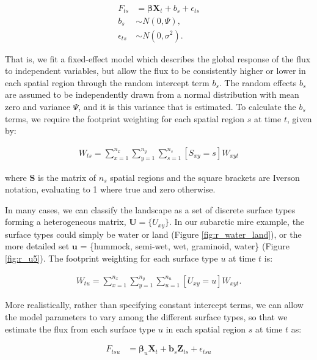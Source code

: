 \begin{align}
   \label{eq:mixed}
  F_{ts} &= \boldsymbol{\beta} \mathbf{X}_t + b_s + \epsilon_{ts} \\
  b_s & \sim N(0, \Psi), \\
  \epsilon_{ts} & \sim N(0, \sigma^2).
\end{align}

That is, we fit a fixed-effect model which describes the global response
of the flux to independent variables, but allow the flux to be
consistently higher or lower in each spatial region through the random
intercept term \(b_s\). The random effects \(b_s\) are assumed to be
independently drawn from a normal distribution with mean zero and
variance \(\Psi\), and it is this variance that is estimated. To
calculate the \(b_s\) terms, we require the footprint weighting for each
spatial region \(s\) at time \(t\), given by:

\begin{align}
   \label{eq:sWtMean} 
  W_{ts} = \sum_{x = 1}^{n_x} \sum_{y = 1}^{n_y}  \sum_{s = 1}^{n_s} [S_{xy} = s] W_{xyt}

\end{align}

where \(\mathbf{S}\) is the matrix of \(n_s\) spatial regions and the
square brackets are Iverson notation, evaluating to 1 where true and
zero otherwise.

In many cases, we can classify the landscape as a set of discrete
surface types forming a heterogeneous matrix,
\(\mathbf{U} = \{U_{xy}\}\). In our subarctic mire example, the surface
types could simply be water or land (Figure \ref{fig:r_water_land}), or
the more detailed set \(\mathbf{u}\) = \{hummock, semi-wet, wet,
graminoid, water\} (Figure \ref{fig:r_u5}). The footprint weighting for
each surface type \(u\) at time \(t\) is:

\begin{align}
   \label{eq:uWtMean} 
  W_{tu} = \sum_{x = 1}^{n_x} \sum_{y = 1}^{n_y}  \sum_{u = 1}^{n_u} [U_{xy} = u] W_{xyt}.

\end{align}

More realistically, rather than specifying constant intercept terms, we
can allow the model parameters to vary among the different surface
types, so that we estimate the flux from each surface type \(u\) in each
spatial region \(s\) at time \(t\) as:

\begin{align}
   \label{eq:lmerModel_ust} 
  F_{tsu} &= \boldsymbol{\beta}_u \mathbf{X}_t + \mathbf{b}_s \mathbf{Z}_{ts} + \epsilon_{tsu}

\end{align}

